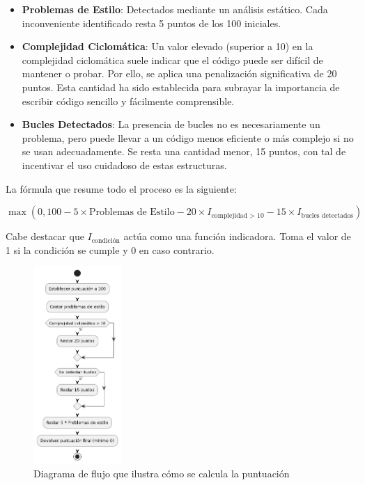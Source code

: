 \begin{itemize}
    \item \textbf{Problemas de Estilo}: Detectados mediante un análisis estático. Cada inconveniente identificado resta 5 puntos de los 100 iniciales.
    
    \item \textbf{Complejidad Ciclomática}: Un valor elevado (superior a 10) en la complejidad ciclomática suele indicar que el código puede ser difícil de mantener o probar. Por ello, se aplica una penalización significativa de 20 puntos. Esta cantidad ha sido establecida para subrayar la importancia de escribir código sencillo y fácilmente comprensible.
        
    \item \textbf{Bucles Detectados}: La presencia de bucles no es necesariamente un problema, pero puede llevar a un código menos eficiente o más complejo si no se usan adecuadamente. Se resta una cantidad menor, 15 puntos, con tal de incentivar el uso cuidadoso de estas estructuras.    
\end{itemize}

La fórmula que resume todo el proceso es la siguiente:

\begin{equation}
\max \left( 0, 100 - 5 \times \text{Problemas de Estilo} - 20 \times I_{\text{complejidad > 10}} - 15 \times I_{\text{bucles detectados}} \right)
\end{equation}

Cabe destacar que $I_{\text{condición}}$ actúa como una función indicadora. Toma el valor de 1 si la condición se cumple y 0 en caso contrario.

\begin{figure}[H]
    \centering
    \includegraphics[width=0.3\textwidth]{imagenes/puntuacionejercicio.png}
    \caption{Diagrama de flujo que ilustra cómo se calcula la puntuación}
    \label{fig:puntuacion}
\end{figure}

